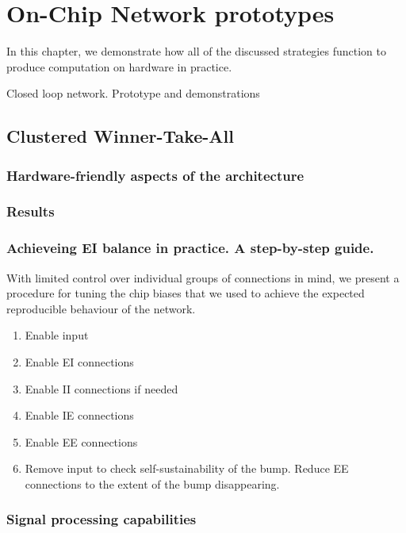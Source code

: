 \chapter{On-Chip Network prototypes}
\label{ch:on_chip_networks}

In this chapter, we demonstrate how all of the discussed strategies function to produce computation on hardware in practice.

Closed loop network.
Prototype and demonstrations

\section{Clustered Winner-Take-All}

\subsection{Hardware-friendly aspects of the architecture}

\subsection{Results}

\subsection{Achieveing EI balance in practice. A step-by-step guide.}

With limited control over individual groups of connections in mind, we present a procedure for tuning the chip biases that we used to achieve the expected reproducible behaviour of the network.

\begin{enumerate}
    \item Enable input
    \item Enable EI connections
    \item Enable II connections if needed
    \item Enable IE connections
    \item Enable EE connections
    \item Remove input to check self-sustainability of the bump. Reduce EE connections to the extent of the bump disappearing.
\end{enumerate}

\subsection{Signal processing capabilities}
